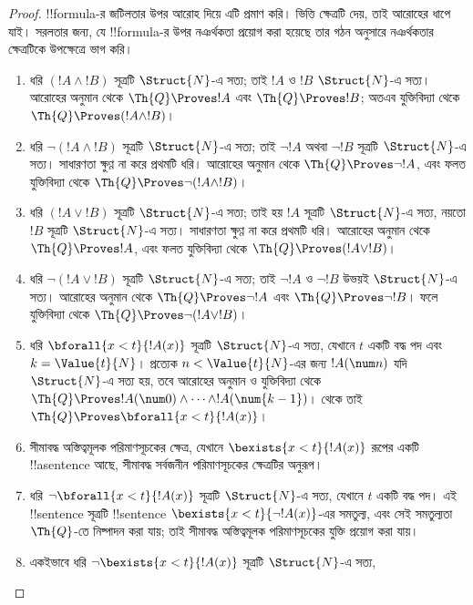 \documentclass[../../../include/open-logic-section]{subfiles}
\begin{document}
\begin{proof}
!!{formula}-র জটিলতার উপর আরোহ দিয়ে এটি প্রমাণ করি।
%
ভিত্তি ক্ষেত্রটি  দেয়, তাই আরোহের ধাপে যাই।
সরলতার জন্য, যে !!{formula}-র উপর নঞর্থকতা প্রয়োগ করা হয়েছে তার গঠন অনুসারে
নঞর্থকতার ক্ষেত্রটিকে উপক্ষেত্রে ভাগ করি।

\begin{enumerate}
\item ধরি $(!A \land !B)$ সূত্রটি $\Struct{N}$-এ সত্য; তাই $!A$ ও $!B$
$\Struct{N}$-এ সত্য। আরোহের অনুমান থেকে $\Th{Q} \Proves !A$ এবং
$\Th{Q} \Proves !B$; অতএব যুক্তিবিদ্যা থেকে
$\Th{Q} \Proves (!A \land !B)$।
%
\item ধরি $\lnot (!A \land !B)$ সূত্রটি $\Struct{N}$-এ সত্য; তাই
$\lnot !A$ অথবা $\lnot !B$ সূত্রটি $\Struct{N}$-এ সত্য। সাধারণতা ক্ষুণ্ণ না
করে প্রথমটি ধরি। আরোহের অনুমান থেকে $\Th{Q} \Proves \lnot !A$, এবং ফলত
যুক্তিবিদ্যা থেকে $\Th{Q} \Proves \lnot (!A \land !B)$।
%
\item ধরি $(!A \lor !B)$ সূত্রটি $\Struct{N}$-এ সত্য; তাই হয় $!A$ সূত্রটি
$\Struct{N}$-এ সত্য, নয়তো $!B$ সূত্রটি $\Struct{N}$-এ সত্য। সাধারণতা ক্ষুণ্ণ
না করে প্রথমটি ধরি। আরোহের অনুমান থেকে
$\Th{Q} \Proves !A$, এবং ফলত যুক্তিবিদ্যা থেকে
$\Th{Q} \Proves (!A \lor !B)$।
%
\item ধরি $\lnot(!A \lor !B)$ সূত্রটি $\Struct{N}$-এ সত্য; তাই
$\lnot !A$ ও $\lnot !B$ উভয়ই $\Struct{N}$-এ সত্য। আরোহের অনুমান থেকে
$\Th{Q} \Proves \lnot !A$ এবং $\Th{Q} \Proves \lnot !B$। ফলে
যুক্তিবিদ্যা থেকে $\Th{Q} \Proves \lnot(!A \lor !B)$।
%
\item ধরি $\bforall{x<t}{!A(x)}$ সূত্রটি $\Struct{N}$-এ সত্য, যেখানে $t$
একটি বদ্ধ পদ এবং $k=\Value{t}{N}$। প্রত্যেক
$n < \Value{t}{N}$-এর জন্য $!A(\num n)$ যদি $\Struct{N}$-এ সত্য হয়, তবে
আরোহের অনুমান ও যুক্তিবিদ্যা থেকে
$\Th{Q} \Proves !A(\num 0) \land \dots \land !A(\num{k-1})$।
 থেকে তাই
$\Th{Q} \Proves \bforall{x<t}{!A(x)}$।
%
\item সীমাবদ্ধ অস্তিত্বমূলক পরিমাণসূচকের ক্ষেত্র, যেখানে
$\bexists{x < t}{!A(x)}$ রূপের একটি !!a{sentence} আছে, সীমাবদ্ধ সর্বজনীন
পরিমাণসূচকের ক্ষেত্রটির অনুরূপ।
%
\item ধরি $\lnot \bforall{x<t}{!A(x)}$ সূত্রটি $\Struct{N}$-এ সত্য,
যেখানে $t$ একটি বদ্ধ পদ। এই !!{sentence} সূত্রটি !!{sentence}
$\bexists{x<t}{\lnot !A(x)}$-এর সমতুল্য, এবং সেই সমতুল্যতা $\Th{Q}$-তে
নিষ্পাদন করা যায়; তাই সীমাবদ্ধ অস্তিত্বমূলক পরিমাণসূচকের যুক্তি প্রয়োগ করা
যায়।
%
\item একইভাবে ধরি $\lnot \bexists{x<t}{!A(x)}$ সূত্রটি $\Struct{N}$-এ সত্য,

\end{enumerate}
\end{proof}
\end{document}
